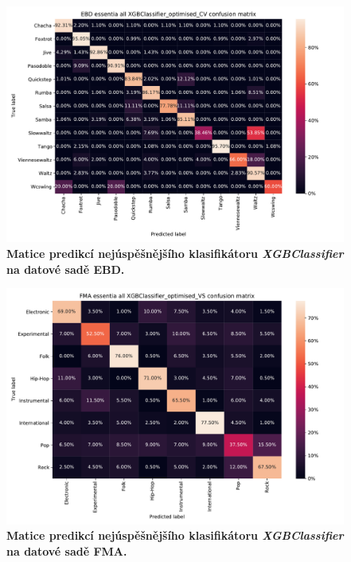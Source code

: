 \begin{figure}[h]
    \centering
    \includegraphics[width=\textwidth]{obrazky/EBD_essentia_all_XGBClassifier_optimised_CV_TS.pdf}
    \caption{\textbf{Matice predikcí nejúspěšnějšího klasifikátoru \textit{XGBClassifier} na datové sadě EBD.}}
    \label{obr_matice_predikce_EBD}
\end{figure}

\begin{figure}[h]
    \centering
    \includegraphics[width=\textwidth]{obrazky/FMA_essentia_all_XGBClassifier_optimised_VS_TS.pdf}
    \caption{\textbf{Matice predikcí nejúspěšnějšího klasifikátoru \textit{XGBClassifier} na datové sadě FMA.}}
    \label{obr_matice_predikce_FMA}
\end{figure}

